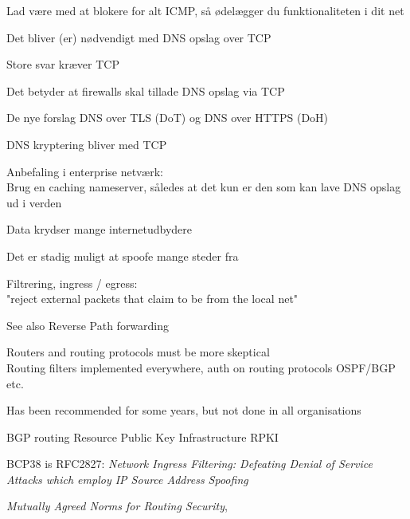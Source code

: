 \documentclass[Screen16to9,17pt]{foils}
\begin{document}
\begin{list1}
\item Lad være med at blokere for alt ICMP, så ødelægger du funktionaliteten i dit net
\end{list1}


\begin{list1}
\item Det bliver (er) nødvendigt med DNS opslag over TCP
\vskip 1cm
\item Store svar kræver TCP
\item Det betyder at firewalls skal tillade DNS opslag via TCP
\vskip 1cm
\item De nye forslag DNS over TLS (DoT) og DNS over HTTPS (DoH)
\item DNS kryptering bliver med TCP
\vskip 1cm
\item Anbefaling i enterprise netværk:\\
Brug en caching nameserver, således at det kun er den som kan lave DNS opslag ud i verden

\end{list1}





\begin{list2}
\item Data krydser mange internetudbydere
\item Det er stadig muligt at spoofe mange steder fra
\end{list2}



\begin{list2}
\item Filtrering, ingress / egress:\\
"reject external packets that claim to be from the local net"
\item See also Reverse Path forwarding 
\item Routers and routing protocols must be more skeptical\\
Routing filters implemented everywhere, auth on routing protocols OSPF/BGP etc.
\item Has been recommended for some years, but not done in all organisations
\item BGP routing Resource Public Key Infrastructure RPKI
\item BCP38 is RFC2827: \emph{Network Ingress Filtering: Defeating Denial of Service Attacks which employ IP Source Address Spoofing}\\
\item \emph{Mutually Agreed Norms for Routing Security}, 
\end{list2}
\end{document}
